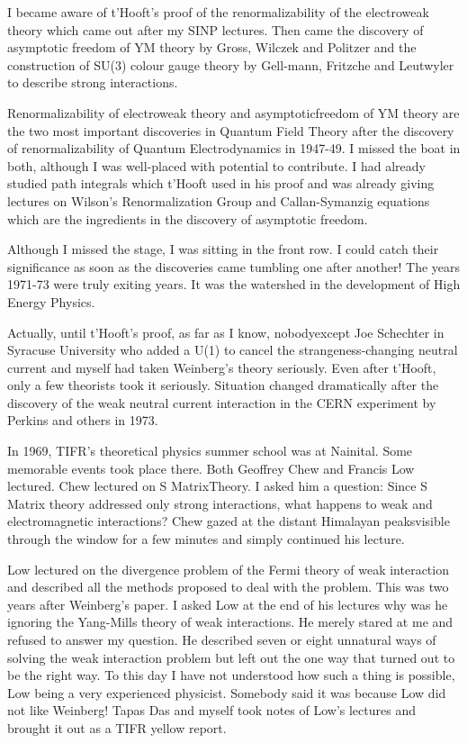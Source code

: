 I became aware of t'Hooft's proof of the renormalizability of the 
electroweak theory which came out after my SINP lectures. Then came the 
discovery of asymptotic freedom of YM theory by Gross, Wilczek and 
Politzer and the construction of SU(3) colour gauge theory by Gell-mann, 
Fritzche and Leutwyler to describe strong interactions.

Renormalizability of electroweak theory and asymptotic\break freedom of YM 
theory are the two most important discoveries in Quantum Field Theory 
after the discovery of renormalizability of Quantum Electrodynamics in 
1947-49. I missed the boat in both, although I was well-placed with 
potential to contribute. I had already studied path integrals which 
t'Hooft used in his proof and was already giving lectures on Wilson's 
Renormalization Group and Callan-Symanzig equations which are the 
ingredients in the discovery of asymptotic freedom.

Although I missed the stage, I was sitting in the front row. I could 
catch their significance as soon as the discoveries came tumbling one 
after another! The years 1971-73 were truly exiting years. It was the 
watershed in the development of High Energy Physics.
  
Actually, until t'Hooft's proof, as far as I know, nobody\break except Joe 
Schechter in Syracuse University who added a U(1) to cancel the 
strangeness-changing neutral current and myself had taken Weinberg's 
theory seriously. Even after t'Hooft, only a few theorists took it 
seriously. Situation changed dramatically after the discovery of the 
weak neutral current interaction in the CERN experiment by Perkins and 
others in 1973.

In 1969, TIFR's theoretical physics summer school was at Naini\-tal. Some 
memorable events took place there. Both Geo\-ffrey Chew and Francis Low 
lectured. Chew lectured on S Matrix\break Theory. I asked him a question: 
Since S Matrix theory addressed only strong interactions, what happens 
to weak and electromagne\-tic interactions? Chew gazed at the distant 
Himalayan peaks\break visible through the window for a few minutes and simply\break 
continued his lecture.

Low lectured on the divergence problem of the Fermi theory of weak 
interaction and described all the methods proposed to deal with the 
problem. This was two years after Weinberg's paper. I asked Low at the 
end of his lectures why was he ignoring the Yang-Mills theory of weak 
interactions. He merely stared at me and refused to answer my question. 
He described seven or eight unnatural ways of solving the weak 
interaction problem but left out the one way that turned out to be the 
right way. To this day I have not understood how such a thing is 
possible, Low being a very experienced physicist. Somebody said it was 
because Low did not like Weinberg! Tapas Das and myself took notes of 
Low's lectures and brought it out as a TIFR yellow report.

